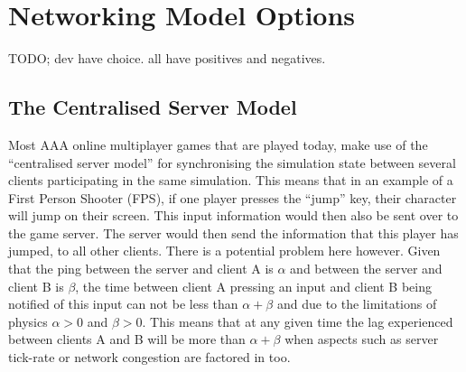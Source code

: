 \newpage
\section{Networking Model Options}
TODO; dev have choice. all have positives and negatives.


\subsection{The Centralised Server Model}
Most AAA online multiplayer games that are played today, make use of the ``centralised server model'' for synchronising the simulation state between several clients participating in the same simulation. This means that in an example of a First Person Shooter (FPS), if one player presses the ``jump'' key, their character will jump on their screen. This input information would then also be sent over to the game server. The server would then send the information that this player has jumped, to all other clients. There is a potential problem here however. Given that the ping between the server and client A is \(\alpha\) and between the server and client B is \(\beta\), the time between client A pressing an input and client B being notified of this input can not be less than $\alpha+\beta$ and due to the limitations of physics $\alpha>0$ and $\beta>0$. This means that at any given time the lag experienced between clients A and B will be more than $\alpha+\beta$ when aspects such as server tick-rate or network congestion are factored in too.





